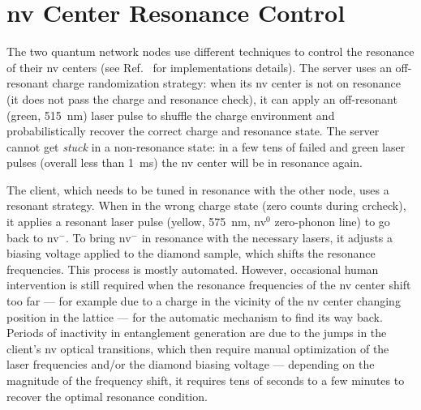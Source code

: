\section{\acrshort{nv} Center Resonance Control}
\label{sec:app:phys:resonance}

The two quantum network nodes use different techniques to control the resonance of their
\acrshort{nv} centers (see Ref.~\cite{pompili_2021_multinode} for implementations details). The
server uses an off-resonant charge randomization strategy: when its \acrshort{nv} center is not on
resonance (it does not pass the charge and resonance check), it can apply an off-resonant (green,
\qty{515}{\nm}) laser pulse to shuffle the charge environment and probabilistically recover the
correct charge and resonance state. The server cannot get \emph{stuck} in a non-resonance state: in
a few tens of failed  and green laser pulses (overall less than \qty{1}{\ms})
the \acrshort{nv} center will be in resonance again.

The client, which needs to be tuned in resonance with the other node, uses a resonant strategy. When
in the wrong charge state (zero counts during \acrshort{crcheck}), it applies a resonant laser pulse
(yellow, \qty{575}{\nm}, \acrshort{nv}${}^0$ zero-phonon line) to go back to \acrshort{nv}${}^-$. To
bring \acrshort{nv}${}^-$ in resonance with the necessary lasers, it adjusts a biasing voltage
applied to the diamond sample, which shifts the resonance frequencies. This process is mostly
automated. However, occasional human intervention is still required when the resonance frequencies
of the \acrshort{nv} center shift too far --- for example due to a charge in the vicinity of the
\acrshort{nv} center changing position in the lattice --- for the automatic mechanism to find its
way back. Periods of inactivity in entanglement generation are due to the jumps in the client's
\acrshort{nv} optical transitions, which then require manual optimization of the laser frequencies
and/or the diamond biasing voltage --- depending on the magnitude of the frequency shift, it
requires tens of seconds to a few minutes to recover the optimal resonance condition.

\printbibliography[heading=subbibintoc,title={References}]
